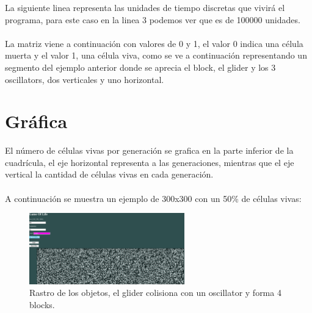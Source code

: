 La siguiente linea representa las unidades de tiempo discretas que vivirá el programa, para este caso en la linea 3 podemos ver que es de 100000 unidades.
\\\\
La matriz viene a continuación con valores de 0 y 1, el valor 0 indica una célula muerta y el valor 1, una célula viva, como se ve a continuación representando un segmento del ejemplo anterior donde se aprecia el block, el glider y los 3 oscillators, dos verticales y uno horizontal.


\section{Gráfica}
El número de células vivas por generación se grafica en la parte inferior de la cuadrícula, el eje horizontal representa a las generaciones, mientras que el eje vertical la cantidad de células vivas en cada generación. 
\\\\
A continuación se muestra un ejemplo de 300x300 con un 50\% de células vivas:

\begin{figure}[h]
	\centering
	\includegraphics[width=0.6\textwidth]{capitulo2/images/grid_plot.png}
	\caption{Rastro de los objetos, el glider colisiona con un oscillator y forma 4 blocks.}
	\label{fig:plotGrid}
\end{figure}

